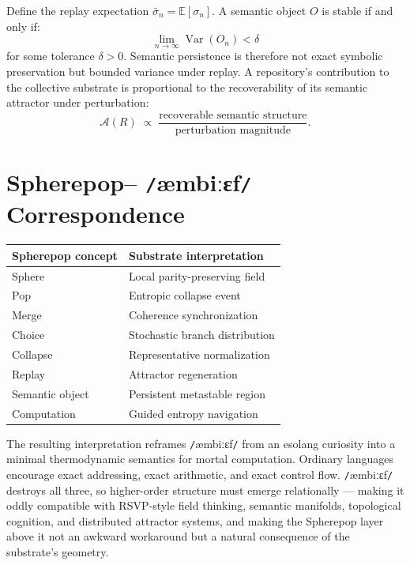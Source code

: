 \documentclass[11pt]{article}
\newcommand{\ambibf}{%
  \texttt{/}\textnormal{æmbiːɛf}\texttt{/}%
}
\begin{document}
Define the replay expectation $\bar{\sigma}_n = \mathbb{E}[\sigma_n]$. A
semantic object $O$ is stable if and only if:
\[
\lim_{n \to \infty} \operatorname{Var}(O_n) < \delta
\]
for some tolerance $\delta > 0$. Semantic persistence is therefore not exact
symbolic preservation but bounded variance under replay. A repository's
contribution to the collective substrate is proportional to the recoverability
of its semantic attractor under perturbation:
\[
\mathcal{A}(R)
\;\propto\;
\frac{\text{recoverable semantic structure}}{\text{perturbation magnitude}}.
\]

\section{Spherepop--\ambibf{} Correspondence}
\label{sec:correspondence}

\medskip
\begin{center}
\begin{tabular}{ll}
\toprule
\textbf{Spherepop concept} & \textbf{Substrate interpretation} \\
\midrule
Sphere          & Local parity-preserving field \\
Pop             & Entropic collapse event \\
Merge           & Coherence synchronization \\
Choice          & Stochastic branch distribution \\
Collapse        & Representative normalization \\
Replay          & Attractor regeneration \\
Semantic object & Persistent metastable region \\
Computation     & Guided entropy navigation \\
\bottomrule
\end{tabular}
\end{center}
\medskip

The resulting interpretation reframes \ambibf{} from an esolang curiosity into
a minimal thermodynamic semantics for mortal computation. Ordinary languages
encourage exact addressing, exact arithmetic, and exact control flow.
\ambibf{} destroys all three, so higher-order structure must emerge
relationally --- making it oddly compatible with RSVP-style field thinking,
semantic manifolds, topological cognition, and distributed attractor systems,
and making the Spherepop layer above it not an awkward workaround but a natural
consequence of the substrate's geometry.
\end{document}
